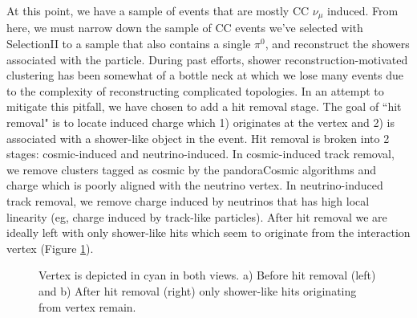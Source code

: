 \documentclass[12pt]{article}
\begin{document}
At this point, we have a sample of events that are mostly CC $\nu_\mu$ induced. From here, we must narrow down the sample of CC events we've selected with SelectionII to a sample that also contains a single $\pi^0$, and reconstruct the showers associated with the particle. During past efforts, shower reconstruction-motivated clustering has been somewhat of a bottle neck at which we lose many events due to the complexity of reconstructing complicated topologies. In an attempt to mitigate this pitfall, we have chosen to add a hit removal stage. The goal of ``hit removal" is to locate induced charge which 1) originates at the vertex and 2) is associated with a shower-like object in the event. Hit removal is broken into 2 stages: cosmic-induced and neutrino-induced.  In cosmic-induced track removal, we remove clusters tagged as cosmic by the pandoraCosmic algorithms and charge which is poorly aligned with the neutrino vertex.  In neutrino-induced track removal, we remove charge induced by neutrinos that has high local linearity (eg, charge induced by track-like particles). After hit removal we are ideally left with only shower-like hits which seem to originate from the interaction vertex (Figure \ref{fig:hitremoval}). %

\begin{figure}[h!]
\centering
{}
\hspace{1 mm}
\caption{Vertex is depicted in cyan in both views. a) Before hit removal (left) and b) After hit removal (right) only shower-like hits originating from vertex remain. }
\label{fig:hitremoval}
\end{figure}
\end{document}
